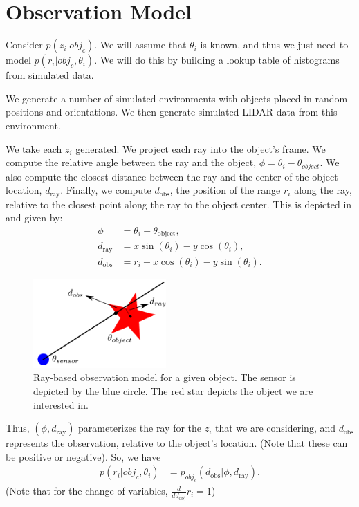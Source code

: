 \section{Observation Model}

Consider $p( z_i | obj_c)$. We will assume that $\theta_i$ is known, and thus we
just need to model $p( r_i | obj_c, \theta_i)$. We will do this by building a
lookup table of histograms from simulated data.

We generate a number of simulated environments with objects placed in random
positions and orientations. We then generate simulated LIDAR data from this
environment.

We take each $z_i$ generated. We project each ray into the object's frame. We
compute the relative angle between the ray and the object, $\phi = \theta_i -
\theta_{object}$. We also compute the closest distance between the ray and the
center of the object location, $d_{\text{ray}}$. Finally, we compute
$d_{\text{obs}}$, the position of the range $r_i$ along the ray, relative to the
closest point along the ray to the object center. This is depicted in
 and given by:
%
\begin{align}
  \phi            &= \theta_i  - \theta_{\text{object}}        \text{,} \\
  d_{\text{ray}}  &= x \sin(\theta_i) - y \cos(\theta_i)       \text{,} \\
  d_{\text{obs}}  &= r_i - x \cos(\theta_i) - y \sin(\theta_i) \text{.}
\end{align}
%
\begin{figure}
  \centering
  \includegraphics[width=2in]{figures/ray_model.pdf}
  \caption{Ray-based observation model for a given object. The sensor is
    depicted by the blue circle. The red star depicts the object we are
    interested in.}
  \label{fig:obs_model}
\end{figure}
%
Thus, $(\phi, d_{\text{ray}})$ parameterizes the ray for the $z_i$ that we are
considering, and $d_{\text{obs}}$ represents the observation, relative to the
object's location. (Note that these can be positive or negative). So, we have
%
\begin{align}
  p( r_i | obj_c, \theta_i) &=
    p_{obj_c}( d_{\text{obs}} | \phi, d_{\text{ray}} )
  \text{.}
\end{align}
%
(Note that for the change of variables, $\frac{d}{d d_{\text{obj}}} r_i = 1$)

